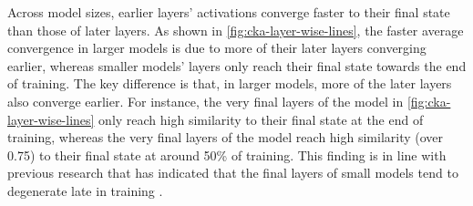 \begin{result}
Across model sizes, earlier layers' activations converge faster to their final state than those of later layers. As shown in \cref{fig:cka-layer-wise-lines}, the faster average convergence in larger models is due to more of their later layers converging earlier, whereas smaller models' layers only reach their final state towards the end of training. The key difference is that, in larger models, more of the later layers also converge earlier. For instance, the very final layers of the \sevenmil model in \cref{fig:cka-layer-wise-lines} only reach high similarity to their final state at the end of training, whereas the very final layers of the \twobil model reach high similarity (over 0.75) to their final state at around 50\% of training. This finding is in line with previous research that has indicated that the final layers of small models tend to degenerate late in training \citep{godey2024small}.
\end{result}
    


\clearpage

